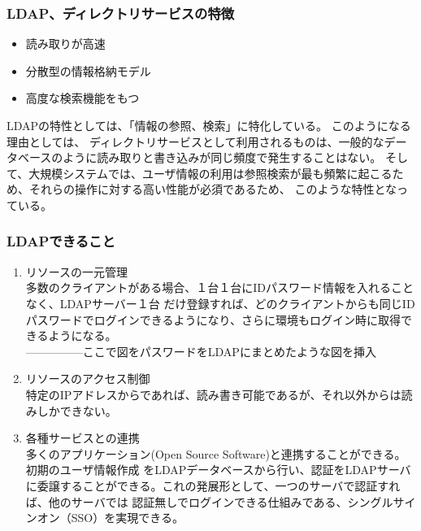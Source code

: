 \documentclass[12pt,a4paper,titlepage]{jsarticle}
\begin{document}
\subsubsection*{LDAP、ディレクトリサービスの特徴}

\begin{itemize}
    \item 読み取りが高速
    \item 分散型の情報格納モデル
    \item 高度な検索機能をもつ
\end{itemize}

LDAPの特性としては、「情報の参照、検索」に特化している。
このようになる理由としては、
ディレクトリサービスとして利用されるものは、一般的なデータベースのように読み取りと書き込みが同じ頻度で発生することはない。
そして、大規模システムでは、ユーザ情報の利用は参照検索が最も頻繁に起こるため、それらの操作に対する高い性能が必須であるため、
このような特性となっている。


\subsubsection*{LDAPできること}
\begin{enumerate}
    \item リソースの一元管理\mbox{}\\多数のクライアントがある場合、１台１台にIDパスワード情報を入れることなく、LDAPサーバー１台
だけ登録すれば、どのクライアントからも同じIDパスワードでログインできるようになり、さらに環境もログイン時に取得できるようになる。
\\---------------ここで図をパスワードをLDAPにまとめたような図を挿入
    \item リソースのアクセス制御\mbox{}\\特定のIPアドレスからであれば、読み書き可能であるが、それ以外からは読みしかできない。
    \item 各種サービスとの連携\mbox{}\\多くのアプリケーション(Open Source Software)と連携することができる。初期のユーザ情報作成
をLDAPデータベースから行い、認証をLDAPサーバに委譲することができる。これの発展形として、一つのサーバで認証すれば、他のサーバでは
認証無しでログインできる仕組みである、シングルサインオン（SSO）を実現できる。
\end{enumerate}
\end{document}
